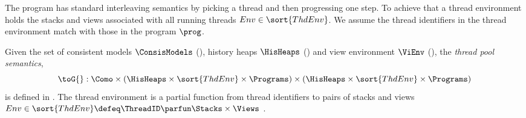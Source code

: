 The program has standard interleaving semantics by picking a thread and then progressing one step.
To achieve that a thread environment holds the stacks and views associated with all running threads \( Env \in \sort{ThdEnv} \).
We assume the thread identifiers in the thread environment match with those in the program \( \prog \).

\begin{defn} 
\label{def:thread_pool_semantics}
\label{def:program_semantics}
Given the set of consistent models \( \ConsisModels \) (), history heaps \(\HisHeaps\) () and view environment \(\ViEnv \) (), the \emph{thread pool semantics}, 
\[
	\toG{} : \Como 
    \times ( \HisHeaps \times \sort{ThdEnv} \times \Programs) 
    \times ( \HisHeaps \times \sort{ThdEnv} \times \Programs) 
\]
is defined in .
The thread environment is a partial function from thread identifiers to pairs of stacks and views \( Env \in \sort{ThdEnv} \defeq \ThreadID \parfun \Stacks \times \Views \) .
\end{defn}
 

